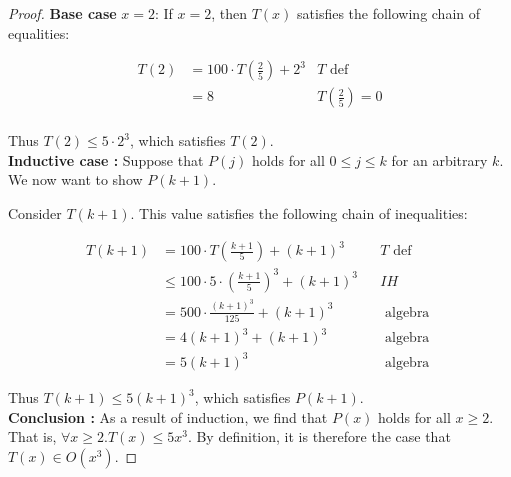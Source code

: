 \documentclass[10pt]{article}
\begin{document}
\begin{enumerate}[label={}]
\begin{proof}
                  \textbf{Base case} $x=2$: If $x=2$, then $T(x)$ satisfies the following chain of equalities:

                  $$
                        \begin{array}{rlrl}
                              T(2) & =100 \cdot T(\frac{2}{5})+2^3 & T \text { def }    \\
                                   & =8                            & T(\frac{2}{5}) = 0 \\
                        \end{array}
                  $$


                  Thus $T(2) \leq 5 \cdot 2^3$, which satisfies $T(2)$.\\

                  \textbf{Inductive case :} Suppose that $P(j)$ holds for all $0 \leq j \leq k$ for an arbitrary $k$. We now want to show $P(k+1)$.

                  Consider $T(k+1)$. This value satisfies the following chain of inequalities:

                  $$\begin{aligned} T(k+1) & =100 \cdot T\left(\frac{k+1}{5}\right)+(k+1)^3 & & T \text { def } \\ & \leq 100 \cdot 5 \cdot\left(\frac{k+1}{5}\right)^3+(k+1)^3 & & I H \\ & =500 \cdot \frac{(k+1)^3}{125}+(k+1)^3 & & \text { algebra } \\ & =4(k+1)^3+(k+1)^3 & & \text { algebra } \\ & =5(k+1)^3 & & \text { algebra }\end{aligned}$$



                  Thus $T(k+1) \leq 5(k+1)^3$, which satisfies $P(k+1)$.\\

                  \textbf{Conclusion :} As a result of induction, we find that $P(x)$ holds for all $x \geq 2$. That is, $\forall x \geq 2 . T(x) \leq 5 x^3$. By definition, it is therefore the case that $T(x) \in O\left(x^3\right)$.
            \end{proof}

\end{enumerate}
\end{document}

